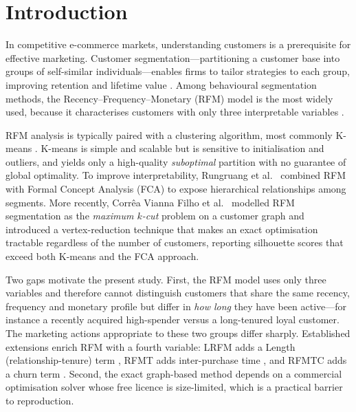 \documentclass[pdflatex,sn-mathphys-num]{sn-jnl}%
\begin{document}
\section{Introduction}\label{sec:intro}

In competitive e-commerce markets, understanding customers is a prerequisite for effective marketing. Customer segmentation---partitioning a customer base into groups of self-similar individuals---enables firms to tailor strategies to each group, improving retention and lifetime value \cite{chengchen2009}. Among behavioural segmentation methods, the Recency--Frequency--Monetary (RFM) model is the most widely used, because it characterises customers with only three interpretable variables \cite{chen2012,christy2021}.

RFM analysis is typically paired with a clustering algorithm, most commonly K-means \cite{chen2012}. K-means is simple and scalable but is sensitive to initialisation and outliers, and yields only a high-quality \emph{suboptimal} partition with no guarantee of global optimality. To improve interpretability, Rungruang et al.\ \cite{rungruang2024} combined RFM with Formal Concept Analysis (FCA) to expose hierarchical relationships among segments. More recently, Corr\^ea Vianna Filho et al.\ \cite{vianna2026} modelled RFM segmentation as the \emph{maximum $k$-cut} problem on a customer graph and introduced a vertex-reduction technique that makes an exact optimisation tractable regardless of the number of customers, reporting silhouette scores that exceed both K-means and the FCA approach.

Two gaps motivate the present study. First, the RFM model uses only three variables and therefore cannot distinguish customers that share the same recency, frequency and monetary profile but differ in \emph{how long} they have been active---for instance a recently acquired high-spender versus a long-tenured loyal customer. The marketing actions appropriate to these two groups differ sharply. Established extensions enrich RFM with a fourth variable: LRFM adds a Length (relationship-tenure) term \cite{changtsay2004}, RFMT adds inter-purchase time \cite{zhou2021}, and RFMTC adds a churn term \cite{yeh2009}. Second, the exact graph-based method depends on a commercial optimisation solver whose free licence is size-limited, which is a practical barrier to reproduction.
\end{document}
